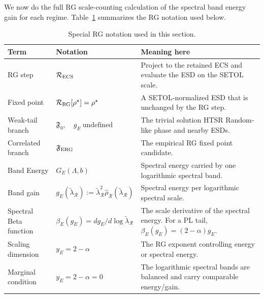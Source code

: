 \documentclass[10pt,twocolumn]{article}
\newcommand{\Fzero}{\mathfrak F_0}
\newcommand{\Ferg}{\mathfrak F_{\rm ERG}}
\newcommand{\Rell}{\mathcal R}
\newcommand{\rhohat}{\widehat\rho}
\begin{document}
We now do the full RG scale-counting calculation of the spectral band energy gain for each regime.
Table~\ref{tab:rgterms} summarizes the  RG notation used below.

\begin{table}[t!]
\centering
\footnotesize
\setlength{\tabcolsep}{5pt}
\renewcommand{\arraystretch}{1.05}
\caption{Special RG notation used in this section.}
\label{tab:rgterms}
\begin{tabularx}{\textwidth}{@{}p{}p{}X@{}}
\toprule
Term & Notation & Meaning here \\
\midrule
RG step &
$\Rell_{\rm ECS}$ &
Project to the retained ECS and evaluate the ESD on the SETOL scale. \\

Fixed point &
$\Rell_{\rm RG}[\rho^\star]=\rho^\star$ &
A SETOL-normalized ESD that is unchanged by the RG step. \\

Weak-tail branch &
$\Fzero,\quad g_E\ \text{undefined}$ &
The trivial solution  HTSR Random-like phase and nearby ESDs. \\

Correlated branch &
$\Ferg$ &
The empirical RG fixed point candidate. \\

Band Energy &
$\displaystyle G_E(\Lambda,b)$ &
Spectral energy carried by one logarithmic spectral band. \\

Band gain &
$g_E(\tilde{\lambda}_{\Rell}):=\tilde{\lambda}_{\Rell}^2\rhohat_{\Rell}(\tilde{\lambda}_{\Rell})$ &
Spectral energy per logarithmic spectral scale. \\

Spectral Beta function &
$\beta_E(g_E)=d g_E/d\log\tilde{\lambda}_{\Rell}$ &
The scale derivative of the spectral energy. For a PL tail, $\beta_E(g_E)=(2-\alpha)g_E$. \\


Scaling dimension &
$y_E=2-\alpha$ &
The RG exponent controlling energy or spectral energy.\\

Marginal condition &
$y_E=2-\alpha=0$ &
The logarithmic spectral bands are balanced and carry comparable energy/gain. \\
\bottomrule
\end{tabularx}
\vspace{-0.6em}
\end{table}
\end{document}
